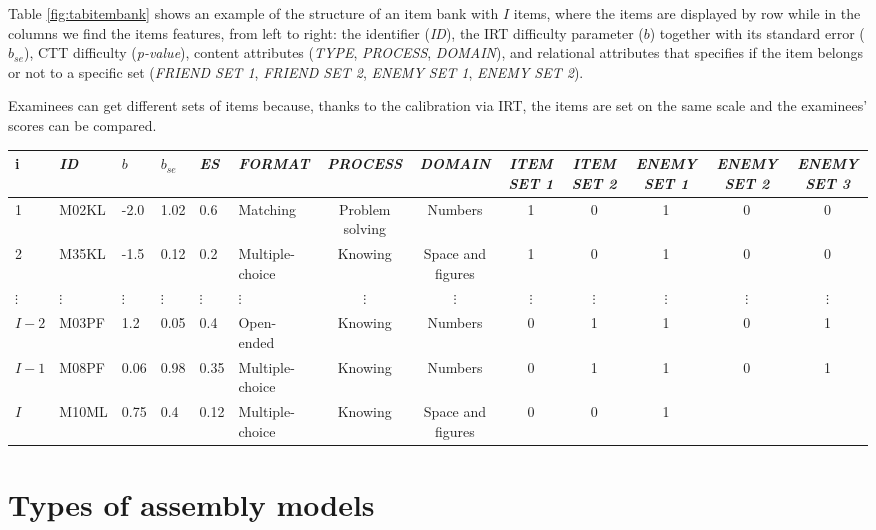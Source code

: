 Table \ref{fig:tabitembank} shows an example of the structure of an item bank with $I$ items, where the items are displayed by row while in the columns we find the items features, from left to right: the identifier (\textsl{ID}), the IRT difficulty parameter ($b$) together with its standard error ($b_{se}$), CTT difficulty (\textsl{p-value}), content attributes (\textsl{TYPE}, \textsl{PROCESS}, \textsl{DOMAIN}), and relational attributes that specifies if the item belongs or not to a specific set (\textsl{FRIEND SET 1}, \textsl{FRIEND SET 2}, \textsl{ENEMY SET 1}, \textsl{ENEMY SET 2}).

Examinees can get different sets of items because, thanks to the calibration via IRT, the items are set on the same scale and the examinees' scores can be compared.



\begin{sidewaystable}
	\scriptsize
	\begin{tabular}{llllllccccccc}
		\hline
		i & \textsl{ID} & $b$ & $b_{se}$ & \textsl{ES} & \textsl{FORMAT} & \textsl{PROCESS} & \textsl{DOMAIN} & \textsl{ITEM SET 1} & \textsl{ITEM SET 2} & \textsl{ENEMY SET 1} & \textsl{ENEMY SET 2} & \textsl{ENEMY SET 3} \\ \hline
		1 & M02KL & -2.0 & 1.02 & 0.6& Matching & Problem solving & Numbers& 1 & 0 & 1 & 0 & 0 \\
		2 & M35KL & -1.5 & 0.12 & 0.2& Multiple-choice & Knowing & Space and figures & 1& 0& 1 & 0 & 0 \\
		$\vdots$ & $\vdots$ & $\vdots$ & $\vdots$ & $\vdots$ & $\vdots$ & $\vdots$ & $\vdots$ & $\vdots$ & $\vdots$ & $\vdots$ & $\vdots$ & $\vdots$ \\
		$I-2$ & M03PF & 1.2 & 0.05 & 0.4 & Open-ended & Knowing & Numbers & 0& 1& 1 & 0 & 1 \\
		$I-1$ & M08PF & 0.06 & 0.98 & 0.35 & Multiple-choice & Knowing & Numbers & 0& 1& 1 & 0 & 1 \\
		$I$ & M10ML & 0.75 & 0.4 & 0.12 & Multiple-choice & Knowing & Space and figures & 0 & 0 & 1
	\end{tabular}
	\caption{Example of item bank.\label{fig:tabitembank}}
\end{sidewaystable}



\section{Types of assembly models}\label{sec:assembly-models}

